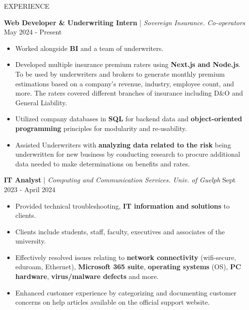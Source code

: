 \begin{rSection}{EXPERIENCE}

\newcommand{\SubItem}[1]{
    {\setlength\itemindent{15pt} \item[\tiny$\bullet] #1}
}

\quad\textbf{Web Developer \& Underwriting Intern} | \textit{Sovereign Insurance. Co-operators} \hfill May 2024 - Present\\
\renewcommand\labelitemi{$\vcenter{\hbox{\tiny$\bullet$}}$}
\begin{itemize}
    \itemsep -5pt {} \vspace{-1.5em} 
        \item Worked alongside \textbf{BI} and a team of underwriters.
        \item Developed multiple insurance premium raters using \textbf{Next.js and Node.js}. To be used by underwriters and brokers to generate monthly premium estimations based on a company's revenue, industry, employee count, and more. The raters covered different branches of insurance including D\&O and General Liability. 
        \item Utilized company databases in \textbf{SQL} for backend data and \textbf{object-oriented programming} principles for modularity and re-usability.
        \item Assisted Underwriters with \textbf{analyzing data related to the risk} being underwritten for new business by conducting research to procure additional data needed to make determinations on benefits and rates.
\end{itemize}

\quad\textbf{IT Analyst} | \textit{Computing and Communication Services. Univ. of Guelph} \hfill Sept 2023 - April 2024\\
\renewcommand\labelitemi{$\vcenter{\hbox{\tiny$\bullet$}}$}
\begin{itemize}
    \itemsep -4pt {} \vspace{-1.5em}
        \item Provided technical troubleshooting, \textbf{IT information and solutions} to clients.
        \item Clients include students, staff, faculty, executives and associates of the university.
        \item Effectively resolved issues relating to \textbf{network connectivity} (wifi-secure, eduroam, Ethernet), \textbf{Microsoft 365 suite}, \textbf{operating systems} (OS), \textbf{PC hardware}, \textbf{virus/malware defects} and more.
        \item Enhanced customer experience by categorizing and documenting customer concerns on help articles available on the official support website.
\end{itemize}

\end{rSection} 


